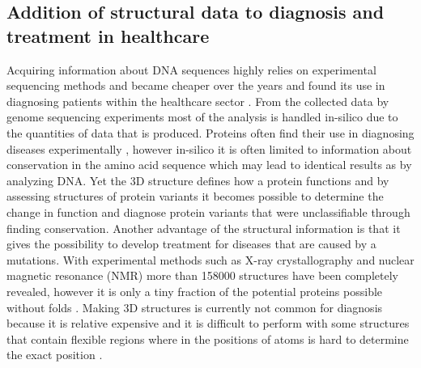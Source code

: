 \subsection{Addition of structural data to diagnosis and treatment in healthcare}
Acquiring information about DNA sequences highly relies on experimental sequencing methods and became cheaper over the years \cite{} and found its use in diagnosing patients within the healthcare sector \cite{}.
From the collected data by genome sequencing experiments most of the analysis is handled in-silico due to the quantities of data that is produced. Proteins often find their use in diagnosing diseases experimentally \cite{}, however in-silico it is often limited to information about conservation in the amino acid sequence which may lead to identical results as by analyzing DNA.
Yet the 3D structure defines how a protein functions \cite{} and by assessing structures of protein variants it becomes possible to determine the change in function and diagnose protein variants that were unclassifiable through finding conservation.
Another advantage of the structural information is that it gives the possibility to develop treatment for diseases that are caused by a mutations. 
With experimental methods such as X-ray crystallography and nuclear magnetic resonance (NMR) more than 158000 structures \cite{} have been completely revealed, however it is only a tiny fraction of the potential proteins possible without folds \cite{}.
Making 3D structures is currently not common for diagnosis because it is relative expensive and it is difficult to perform with some structures that contain flexible regions where in the positions of atoms is hard to determine the exact position \cite{}.
\newpage

